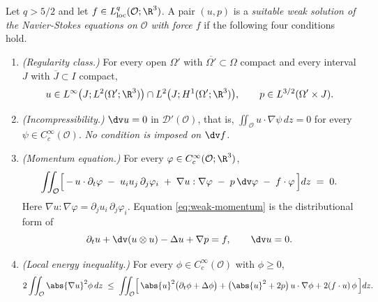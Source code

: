 \documentclass[11pt,reqno]{amsart}
\begin{document}
\begin{definition}\label{def:sws}
Let $q>5/2$ and let $f\in L^{q}_{\mathrm{loc}}(\mathcal{O};\R^{3})$. A pair
$(u,p)$ is a \emph{suitable weak solution of the Navier-Stokes equations on
$\mathcal{O}$ with force $f$} if the following four conditions hold.
\begin{enumerate}
\item[(S1)] \emph{(Regularity class.)} For every open $\Omega'$ with
  $\overline{\Omega'}\subset\Omega$ compact and every interval $J$ with
  $\overline{J}\subset I$ compact,
  \[
    u\in L^{\infty}\bigl(J;L^{2}(\Omega';\R^{3})\bigr)
        \cap L^{2}\bigl(J;H^{1}(\Omega';\R^{3})\bigr),
    \qquad
    p\in L^{3/2}(\Omega'\times J).
  \]
\item[(S2)] \emph{(Incompressibility.)} $\dv u=0$ in
  $\mathcal{D}'(\mathcal{O})$, that is,
  $\iint_{\mathcal{O}}u\cdot\nabla\psi\,dz=0$ for every
  $\psi\in C_{c}^{\infty}(\mathcal{O})$. \emph{No condition is imposed on
  $\dv f$.}
\item[(S3)] \emph{(Momentum equation.)} For every
  $\varphi\in C^{\infty}_{c}(\mathcal{O};\R^{3})$,
  \begin{equation}\label{eq:weak-momentum}
    \iint_{\mathcal{O}}
      \Bigl[\,-\,u\cdot\partial_{t}\varphi
        \;-\;u_{i}u_{j}\,\partial_{j}\varphi_{i}
        \;+\;\nabla u:\nabla\varphi
        \;-\;p\,\dv\varphi
        \;-\;f\cdot\varphi\,\Bigr]dz \;=\;0 .
  \end{equation}
  Here $\nabla u:\nabla\varphi=\partial_{j}u_{i}\,\partial_{j}\varphi_{i}$.
  Equation \eqref{eq:weak-momentum} is the distributional form of
  \begin{equation}\label{eq:NS}
    \partial_{t}u+\dv(u\otimes u)-\Delta u+\nabla p=f,
    \qquad \dv u=0 .
  \end{equation}
\item[(S4)] \emph{(Local energy inequality.)} For every
  $\phi\in C_{c}^{\infty}(\mathcal{O})$ with $\phi\ge0$,
  \begin{equation}\label{eq:lei}
    2\iint_{\mathcal{O}}\abs{\nabla u}^{2}\phi\,dz
    \;\le\;
    \iint_{\mathcal{O}}\Bigl[\,\abs{u}^{2}\bigl(\partial_{t}\phi+\Delta\phi\bigr)
      +\bigl(\abs{u}^{2}+2p\bigr)\,u\cdot\nabla\phi
      +2(f\cdot u)\,\phi\,\Bigr]dz .
  \end{equation}
\end{enumerate}
\end{definition}
\end{document}
